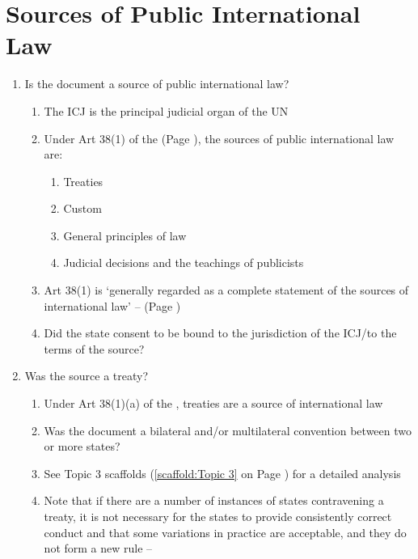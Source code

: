 \section{Sources of Public International Law}
\begin{enumerate}
    \item Is the document a source of public international law?
    \begin{enumerate}
        \item The ICJ is the principal judicial organ of the UN
        \item Under Art 38(1) of the  (Page \pageref{ICJ Statute Art 38}), the sources of public international law are:
        \begin{enumerate}
            \item Treaties
            \item Custom
            \item General principles of law
            \item Judicial decisions and the teachings of publicists
        \end{enumerate}
        \item Art 38(1) is `generally regarded as a complete statement of the sources of international law' --  (Page \pageref{case:Ure v Commonwealth})
        \item Did the state consent to be bound to the jurisdiction of the ICJ/to the terms of the source?
    \end{enumerate}
    \item Was the source a treaty?
    \begin{enumerate}
        \item Under Art 38(1)(a) of the , treaties are a source of international law
        \item Was the document a bilateral and/or multilateral convention between two or more states?
        \item See Topic 3 scaffolds (\ref{scaffold:Topic 3} on Page \pageref{scaffold:Topic 3}) for a detailed analysis
        \item Note that if there are a number of instances of states contravening a treaty, it is not necessary for the states to provide consistently correct conduct and that some variations in practice are acceptable, and they do not form a new rule -- 

\end{enumerate}
\end{enumerate}
